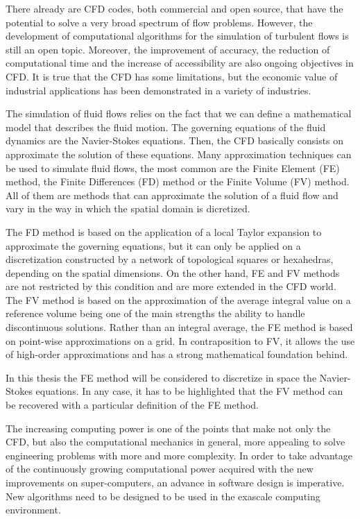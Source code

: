 There already are CFD codes, both commercial and open source, that have the potential to solve a very broad spectrum of flow problems. However, the development of computational algorithms for the simulation of turbulent flows is still an open topic. Moreover, the improvement of accuracy, the reduction of computational time and the increase of accessibility are also ongoing objectives in CFD. It is true that the CFD has some limitations, but the economic value of industrial applications has been demonstrated in a variety of industries.

The simulation of fluid flows relies on the fact that we can define a mathematical model that describes the fluid motion. The governing equations of the fluid dynamics are the Navier-Stokes equations. Then, the CFD basically consists on approximate the solution of these equations. Many approximation techniques can be used to simulate fluid flows, the most common are the Finite Element (FE) method, the Finite Differences (FD) method or the Finite Volume (FV) method. All of them are methods that can approximate the solution of a fluid flow and vary in the way in which the spatial domain is dicretized. 

The FD method is based on the application of a local Taylor expansion to approximate the governing equations, but it can only be applied on a discretization constructed by a network of topological squares or hexahedras, depending on the spatial dimensions. On the other hand, FE and FV methods are not restricted by this condition and are more extended in the CFD world. The FV method is based on the approximation of the average integral value on a reference volume being one of the main strengths the ability to handle discontinuous solutions. Rather than an integral average, the FE method is based on point-wise approximations on a grid. In contraposition to FV, it allows the use of high-order approximations and has a strong mathematical foundation behind.

In this thesis the FE method will be considered to discretize in space the Navier-Stokes equations. In any case, it has to be highlighted that the FV method can be recovered with a particular definition of the FE method.

The increasing computing power is one of the points that make not only the CFD, but also the computational mechanics in general, more appealing to solve engineering problems with more and more complexity. In order to take advantage of the continuously growing computational power acquired with the new improvements on super-computers, an advance in software design is imperative. New algorithms need to be designed to be used in the exascale computing environment. 


